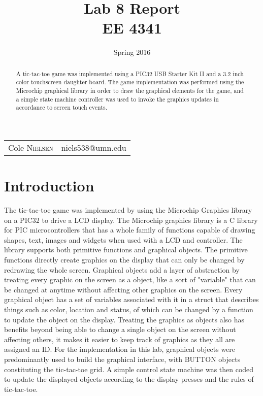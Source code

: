 \documentclass[12pt]{article}
\title{Lab 8 Report\\ \vspace{0.3 in} EE 4341}
\date{Spring 2016}
\begin{document}
\maketitle 
\begin{center}
 \begin{tabular}{l r}
   Cole \textsc{Nielsen} & niels538@umn.edu\\ 
\end{tabular}
\end{center}
\pagebreak
\pagebreak
\begin{abstract} 
\noindent A tic-tac-toe game was implemented using a PIC32 USB Starter Kit II and a 3.2 inch color touchscreen daughter board. The game implementation was performed using the Microchip graphical library in order to draw the graphical elements for the game, and a simple state machine controller was used to invoke the graphics updates in accordance to screen touch events.
\end{abstract}
\hrulefill
\section{Introduction}
The tic-tac-toe game was implemented by using the Microchip Graphics library on a PIC32 to drive a LCD display. The Microchip graphics library is a C library for PIC microcontrollers that has a whole family of functions capable of drawing shapes, text, images and widgets when used with a LCD and controller. The library supports both primitive functions and graphical objects. The primitive functions directly create graphics on the display that can only be changed by redrawing the whole screen. Graphical objects add a layer of abstraction by treating every graphic on the screen as a object, like a sort of "variable" that can be changed at anytime without affecting other graphics on the screen. Every graphical object has a set of variables associated with it in a struct that describes things such as color, location and status, of which can be changed by a function to update the object on the display. Treating the graphics as objects also has benefits beyond being able to change a single object on the screen without affecting others, it makes it easier to keep track of graphics as they all are assigned an ID. For the implementation in this lab, graphical objects were predominantly used to build the graphical interface, with BUTTON objects constituting the tic-tac-toe grid. A simple control state machine was then coded to update the displayed objects according to the display presses and the rules of tic-tac-toe.
\end{document}
